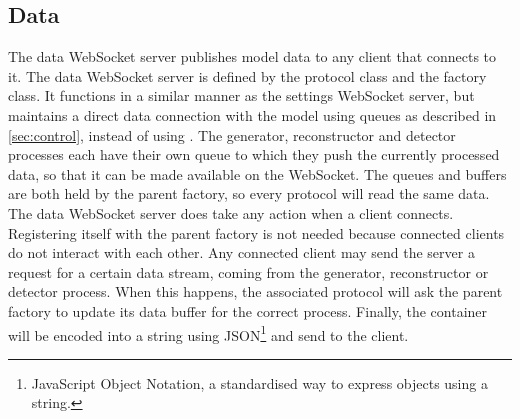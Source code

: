 \documentclass[a4paper, openany, oneside]{memoir}
\begin{document}
\subsection{Data}
\label{sub:websocket_data}
The data WebSocket server publishes model data to any client that connects to it. The data WebSocket server is defined by the  protocol class and the  factory class. It functions in a similar manner as the settings WebSocket server, but maintains a direct data connection with the model using queues as described in \cref{sec:control}, instead of using . The generator, reconstructor and detector processes each have their own queue to which they push the currently processed data, so that it can be made available on the WebSocket. The queues and buffers are both held by the parent factory, so every protocol will read the same data.
The data WebSocket server does take any action when a client connects. Registering itself with the parent factory is not needed because connected clients do not interact with each other.
Any connected client may send the server a request for a certain data stream, coming from the generator, reconstructor or detector process.
When this happens, the associated protocol will ask the parent factory to update its data buffer for the correct process. Finally, the container will be encoded into a string using JSON\footnote{JavaScript Object Notation, a standardised way to express objects using a string.} and send to the client.
\end{document}
